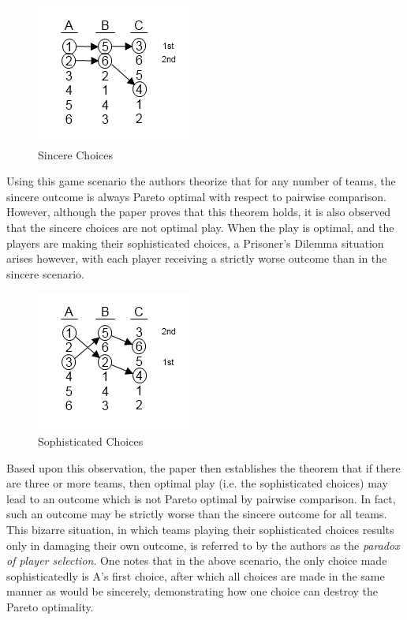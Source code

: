 \documentclass{article}
\begin{document}
\begin{figure}[H]
	\centering
	\includegraphics[scale=1.0]{ThreeOrMoreSincere}
	\caption{Sincere Choices}
\end{figure}

Using this game scenario the authors theorize that for any number of teams, the sincere outcome is always Pareto optimal with respect to pairwise comparison. However, although the paper proves that this theorem holds, it is also observed that the sincere choices are not optimal play. When the play is optimal, and the players are making their sophisticated choices, a Prisoner's Dilemma situation arises however, with each player receiving a strictly worse outcome than in the sincere scenario.

\begin{figure}[H]
	\centering
	\includegraphics[scale=1.0]{ThreeOrMoreSophisticated}
	\caption{Sophisticated Choices}
\end{figure}

Based upon this observation, the paper then establishes the theorem that if there are three or more teams, then optimal play (i.e. the sophisticated choices) may lead to an outcome which is not Pareto optimal by pairwise comparison. In fact, such an outcome may be strictly worse than the sincere outcome for all teams. This bizarre situation, in which teams playing their sophisticated choices results only in damaging their own outcome, is referred to by the authors as the {\em paradox of player selection}. One notes that in the above scenario, the only choice made sophisticatedly is A's first choice, after which all choices are made in the same manner as would be sincerely, demonstrating how one choice can destroy the Pareto optimality.
\end{document}
